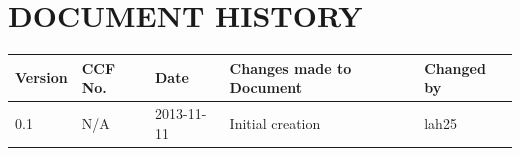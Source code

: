 \documentclass{project}
\begin{document}
\section*{DOCUMENT HISTORY}
\begin{flushleft}
\begin{tabular}{ | p{1.5cm} | p{1cm} | p{2cm} | p{6cm}| p{1.5cm}| }
\hline
Version & CCF No. & Date & Changes made to Document & Changed by \\
\hline

0.1 & N/A & 2013-11-11 & Initial creation & lah25 \\
\hline

\end{tabular}
\end{flushleft}
\label{thelastpage}
\end{document}
